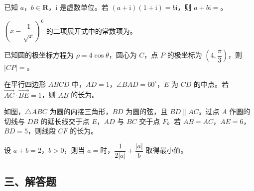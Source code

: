 \begin{question}
已知 $a$，$b\in\mathbf{R}$，$\mathrm i$ 是虚数单位。若 $(a+\mathrm i)(1+\mathrm i)=b\mathrm i$，则 $a+b\mathrm i=$\gkblank{}。

\end{question}
\begin{question}
$\left(x-\dfrac{1}{\sqrt{x}}\right)^6$ 的二项展开式中的常数项为\gkblank{}。

\end{question}
\begin{question}
已知圆的极坐标方程为 $\rho=4\cos\theta$，圆心为 $C$，点 $P$ 的极坐标为 $\left(4,\dfrac{\pi}{3}\right)$，则 $|CP|=$\gkblank{}。

\end{question}
\begin{question}
在平行四边形 $ABCD$ 中，$AD=1$，$\angle BAD=60^\circ$，$E$ 为 $CD$ 的中点。若 $\overrightarrow{AC}\cdot\overrightarrow{BE}=1$，则 $AB$ 的长为\gkblank{}。

\Needspace{0.4\textheight}
\end{question}
\begin{question}
如图，$\triangle ABC$ 为圆的内接三角形，$BD$ 为圆的弦，且 $BD\parallel AC$。过点 $A$ 作圆的切线与 $DB$ 的延长线交于点 $E$，$AD$ 与 $BC$ 交于点 $F$。若 $AB=AC$，$AE=6$，$BD=5$，则线段 $CF$ 的长为\gkblank{}。
\nopagebreak[4]
\begin{center}\end{center}
\nopagebreak[4]
\end{question}
\begin{question}
设 $a+b=2$，$b>0$，则当 $a=$\gkblank{}时，$\dfrac{1}{2|a|}+\dfrac{|a|}{b}$ 取得最小值。

\end{question}
\begingroup
\renewcommand{\gkpart}[1]{\Needspace{0.4\textheight}\subsection*{#1}\nopagebreak}
\gkpart{三、解答题}
\endgroup

